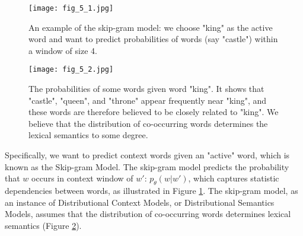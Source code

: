 \documentclass[../book-template.tex]{subfiles}
\begin{document}
\begin{figure}[h] 
	\centering 
	\texttt{[image: fig\_5\_1.jpg]} 
	\caption{An example of the skip-gram model: we choose "king" as the active word and want to predict probabilities of words (say "castle") within a window of size 4.}\label{fig_5_1}
\end{figure}
\begin{figure}[h] 
	\centering 
	\texttt{[image: fig\_5\_2.jpg]} 
	\caption{The probabilities of some words given word "king". It shows that "castle", "queen", and "throne" appear frequently near "king", and these words are therefore believed to be closely related to "king". We believe that the distribution of co-occurring words determines the lexical semantics to some degree.}\label{fig_5_2}
\end{figure}
\par Specifically, we want to predict context words given an "active" word, which is known as the Skip-gram Model. The skip-gram model predicts the probability that $w$ occurs in context window of $w'$: $p_{\theta}(w|w')$, which captures statistic dependencies between words, as illustrated in Figure \ref{fig_5_1}. The skip-gram model, as an instance of Distributional Context Models, or Distributional Semantics Models, assumes that the distribution of co-occurring words determines lexical semantics (Figure \ref{fig_5_2}).
\end{document}

